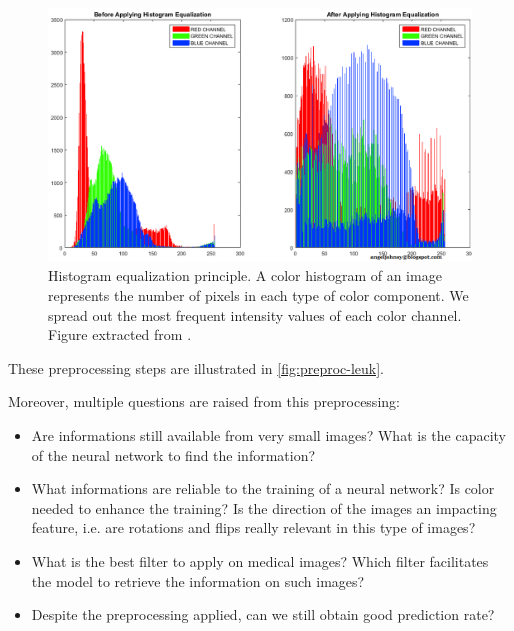 \documentclass[11pt, openany]{report}
\theoremstyle{plain}
\theoremstyle{definition}
\theoremstyle{remark}
\begin{document}
\begin{figure}[H]
  \centering
  \includegraphics[scale=0.3]{figures/color_histogram_plot.png}
  \caption{Histogram equalization principle. A color histogram of an image represents the number of pixels in each type of color component. We spread out the most frequent intensity values of each color channel. Figure extracted from \cite{hist-eq-fig}.}
  \label{fig:hist-eq}
\end{figure}

These preprocessing steps are illustrated in \autoref{fig:preproc-leuk}. 

Moreover, multiple questions are raised from this preprocessing: 

\begin{itemize}
\item Are informations still available from very small images? What is the capacity of the neural network to find the information? 
\item What informations are reliable to the training of a neural network? Is color needed to enhance the training? Is the direction of the images an impacting feature, i.e. are rotations and flips really relevant in this type of images?  
\item What is the best filter to apply on medical images? Which filter facilitates the model to retrieve the information on such images? 
\item Despite the preprocessing applied, can we still obtain good prediction rate? 
\end{itemize} 
\end{document}
